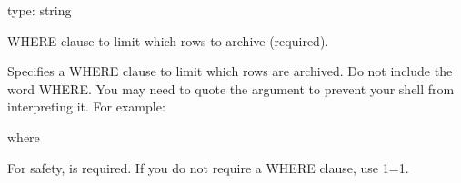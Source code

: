 \documentclass[letterpaper,10pt,english]{sphinxmanual}
\begin{document}
\begin{fulllineitems}
\label{\detokenize{mariadb-archiver:cmdoption-mariadb-archiver-where}}
\sphinxAtStartPar
type: string

\sphinxAtStartPar
WHERE clause to limit which rows to archive (required).

\sphinxAtStartPar
Specifies a WHERE clause to limit which rows are archived.  Do not include the
word WHERE.  You may need to quote the argument to prevent your shell from
interpreting it.  For example:

\begin{sphinxVerbatim}[commandchars=\\\{\}]
\PYGZhy{}\PYGZhy{}where 
\end{sphinxVerbatim}

\sphinxAtStartPar
For safety, {\hyperref[\detokenize{mariadb-archiver:cmdoption-mariadb-archiver-where}]{}} is required.  If you do not require a WHERE clause, use
{\hyperref[\detokenize{mariadb-archiver:cmdoption-mariadb-archiver-where}]{}} 1=1.

\end{fulllineitems}

\end{document}
